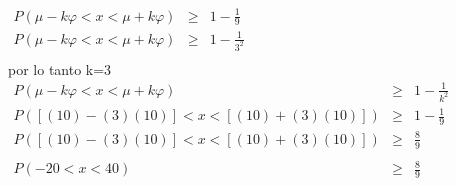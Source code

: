 \documentclass[12pt, letterpaper]{article}
\begin{document}
\begin{itemize}
\begin{center}
\begin{math}
\begin{array}{ccc}
                        P(\mu-k\varphi<x<\mu+k\varphi)&\geq&1-\displaystyle\frac{1}{9}\\
                        P(\mu-k\varphi<x<\mu+k\varphi)&\geq&1-\displaystyle\frac{1}{3^2}\\
                    \end{array}
                \end{math}\\
                por lo tanto k=3\\
                $\begin{array}{ccc}
                    P(\mu-k\varphi<x<\mu+k\varphi)&\geq&1-\displaystyle\frac{1}{k^2}\\
                    P([(10)-(3)(10)]<x<[(10)+(3)(10)])&\geq&1-\displaystyle\frac{1}{9}\\
                    P([(10)-(3)(10)]<x<[(10)+(3)(10)])&\geq&\displaystyle\frac{8}{9}\\
                    \\
                    P(-20<x<40)&\geq&\displaystyle\frac{8}{9}\\
                \end{array}$

            \end{center}

\end{itemize}
\end{document}
